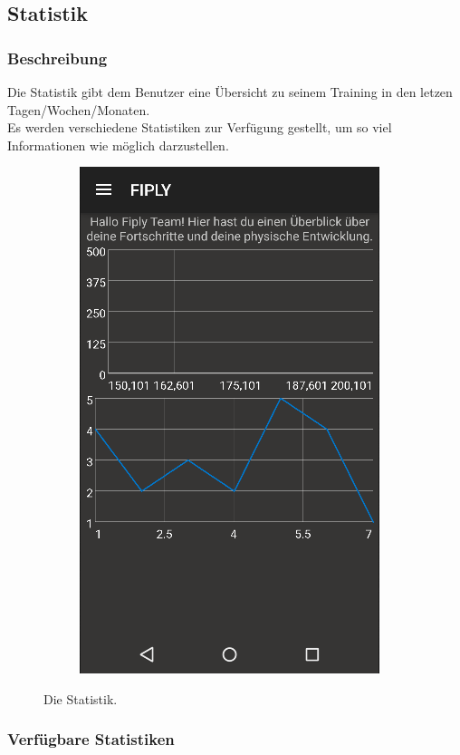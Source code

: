 \documentclass[FIPLY_base.tex]{subfiles}
\begin{document}
\subsection{Statistik}

\subsubsection{Beschreibung}
Die Statistik gibt dem Benutzer eine Übersicht zu seinem Training in den letzen Tagen/Wochen/Monaten. 
\ \\
Es werden verschiedene Statistiken zur Verfügung gestellt, um so viel Informationen wie möglich darzustellen.

\begin{figure}[H]
	\begin{subfigure}[b]{0.3\textwidth}
	\includegraphics[scale=0.50]{img/Statistik}
	\end{subfigure}
	\hfil
	\caption{Die Statistik.}
\end{figure}

\newpage
\subsubsection{Verfügbare Statistiken}
\end{document}
